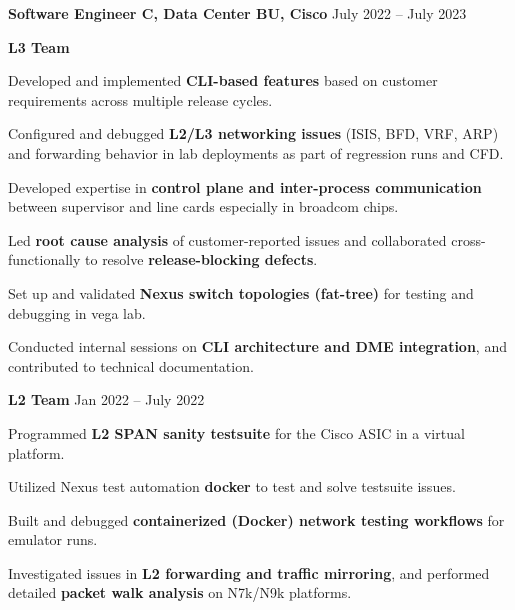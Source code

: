 \documentclass[10pt]{article}
\begin{document}
\textbf{Software Engineer C, Data Center BU, Cisco} \hfill July 2022 -- July 2023

\quad \textbf{L3 Team}
\begin{compactitem}
\item Developed and implemented \textbf{CLI-based features} based on customer requirements across multiple release cycles.
\item Configured and debugged \textbf{L2/L3 networking issues} (ISIS, BFD, VRF, ARP) and forwarding behavior in lab deployments as part of regression runs and CFD.
\item Developed expertise in \textbf{control plane and inter-process communication} between supervisor and line cards especially in broadcom chips.
\item Led \textbf{root cause analysis} of customer-reported issues and collaborated cross-functionally to resolve \textbf{release-blocking defects}.
\item Set up and validated \textbf{Nexus switch topologies (fat-tree)} for testing and debugging in vega lab.
\item Conducted internal sessions on \textbf{CLI architecture and DME integration}, and contributed to technical documentation.
\end{compactitem}

\quad \textbf{L2 Team} \hfill Jan 2022 -- July 2022
\begin{compactitem}
\item Programmed \textbf{L2 SPAN sanity testsuite} for the Cisco ASIC in a virtual platform.
\item Utilized Nexus test automation \textbf{docker} to test and solve testsuite issues.
\item Built and debugged \textbf{containerized (Docker) network testing workflows} for emulator runs.
\item Investigated issues in \textbf{L2 forwarding and traffic mirroring}, and performed detailed \textbf{packet walk analysis} on N7k/N9k platforms.
\end{compactitem}

\end{document}
